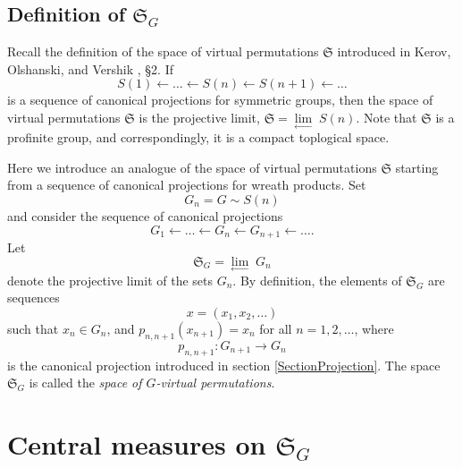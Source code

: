 \documentclass[12pt]{amsart}
\theoremstyle{definition}
\numberwithin{equation}{section}
\begin{document}
\subsection{Definition of $\mathfrak{S}_{G}$}
Recall the definition of the space of virtual permutations $\mathfrak{S}$ introduced in Kerov, Olshanski, and Vershik \cite{KerovOlshanskiVershik}, \S 2. If
$$
S(1)\longleftarrow\ldots\longleftarrow S(n)\longleftarrow S(n+1)\longleftarrow\ldots
$$
is a sequence of canonical projections for symmetric groups, then the space of virtual permutations $\mathfrak{S}$ is the projective limit, $\mathfrak{S}=\underset{\longleftarrow}{\lim}\;S(n)$. Note that $\mathfrak{S}$ is a profinite group, and correspondingly,
it is a compact toplogical space.

Here we introduce an analogue of the space of virtual permutations $\mathfrak{S}$ starting from
a sequence of canonical projections for wreath products. Set
$$
G_n=G\sim S(n)
$$
and consider the sequence of canonical projections
$$
G_1\longleftarrow\ldots\longleftarrow G_n\longleftarrow G_{n+1}\longleftarrow\ldots .
$$
Let
$$
\mathfrak{S}_{G}=\underset{\longleftarrow}{\lim}\;G_n
$$
denote the projective limit of the sets $G_n$. By definition, the elements of $\mathfrak{S}_{G}$ are sequences
$$
x=\left(x_1,x_2,\ldots\right)
$$
such that $x_n\in G_n$, and $p_{n,n+1}\left(x_{n+1}\right)=x_n$ for all $n=1,2,\ldots$, where
$$
p_{n,n+1}: G_{n+1}\longrightarrow G_n
$$
is the canonical projection introduced in section \ref{SectionProjection}. The space $\mathfrak{S}_{G}$ is called the \textit{space of $G$-virtual permutations}.
\section{Central measures on $\mathfrak{S}_{G}$}
\end{document}
